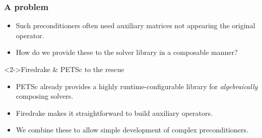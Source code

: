 \documentclass[presentation,aspectratio=43]{beamer}
\begin{document}
\begin{frame}
  \frametitle{A problem}
  \begin{itemize}
  \item Such preconditioners often need auxiliary matrices not
    appearing the original operator.
  \item How do we provide these to the solver library in a composable
    manner?
  \end{itemize}
  \begin{block}<2->{Firedrake \& PETSc to the rescue}
  \begin{itemize}
  \item PETSc already provides a highly runtime-configurable library
    for \emph{algebraically} composing solvers. \nocite{Brown:2012}

  \item Firedrake makes it straightforward to build auxiliary
    operators.

  \item We combine these to allow simple development of complex
    preconditioners.
  \end{itemize}
  \end{block}
\end{frame}
\end{document}

